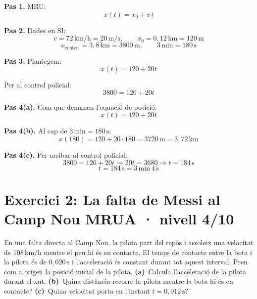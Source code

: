 \documentclass[11pt,a4paper]{article}
\begin{document}
\begin{solutionbox}
\textbf{Pas 1.} MRU:
\[
x(t)=x_0+v\,t
\]

\textbf{Pas 2.} Dades en SI:
\[
v=72\,\mathrm{km/h}=20\,\mathrm{m/s}, \qquad x_0=0{,}12\,\mathrm{km}=120\,\mathrm{m}
\]
\[
x_{\text{control}}=3{,}8\,\mathrm{km}=3800\,\mathrm{m}, \qquad 3\,\mathrm{min}=180\,\mathrm{s}
\]

\textbf{Pas 3.} Plantegem:
\[
x(t)=120+20t
\]

Per al control policial:
\[
3800=120+20t
\]

\textbf{Pas 4(a).} Com que demanen l'equació de posició:
\[
x(t)=120+20t
\]

\textbf{Pas 4(b).} Al cap de $3\,\mathrm{min}=180\,\mathrm{s}$:
\[
x(180)=120+20\cdot 180=3720\,\mathrm{m}=3{,}72\,\mathrm{km}
\]

\textbf{Pas 4(c).} Per arribar al control policial:
\[
3800=120+20t \Longrightarrow 20t=3680 \Longrightarrow t=184\,\mathrm{s}
\]
\[
t=184\,\mathrm{s}=3\,\mathrm{min}\ 4\,\mathrm{s}
\]
\end{solutionbox}

\clearpage

\section*{Exercici 2: La falta de Messi al Camp Nou \hfill \normalfont MRUA · nivell 4/10}

En una falta directa al Camp Nou, la pilota part del repòs i assoleix una velocitat de $108\,\mathrm{km/h}$ mentre el peu hi és en contacte. El temps de contacte entre la bota i la pilota és de $0{,}020\,\mathrm{s}$ i l'acceleració és constant durant tot aquest interval. Pren com a origen la posició inicial de la pilota. \textbf{(a)}~Calcula l'acceleració de la pilota durant el xut. \textbf{(b)}~Quina distància recorre la pilota mentre la bota hi és en contacte? \textbf{(c)}~Quina velocitat porta en l'instant $t=0{,}012\,\mathrm{s}$?
\end{document}
